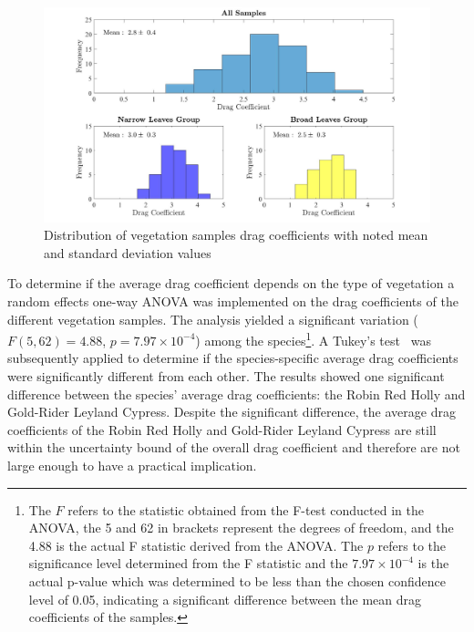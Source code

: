 \documentclass[12pt]{article}
\begin{document}
\begin{figure}[!]
\includegraphics[width=\textwidth,keepaspectratio]{Picture11.jpg}
	\caption[Distribution of drag coefficients for all samples (top), samples with narrow leaves (bottom left), samples with broad leaves (bottom right)]{Distribution of vegetation samples drag coefficients with noted mean and standard deviation values}
	\label{fig:Histogram}
\end{figure}

To determine if the average drag coefficient depends on the type of vegetation a random effects one-way ANOVA was implemented on the drag coefficients of the different vegetation samples. The analysis yielded a significant variation ($F(5,62)=4.88$, $p=7.97 \times 10^{-4}$) among the species\footnote{The $F$ refers to the statistic obtained from the F-test conducted in the ANOVA, the 5 and 62 in brackets represent the degrees of freedom, and the 4.88 is the actual F statistic derived from the ANOVA. The $p$ refers to the significance level determined from the F statistic and the $7.97 \times 10^{-4}$ is the actual p-value which was determined to be less than the chosen confidence level of 0.05, indicating a significant difference between the mean drag coefficients of the samples.}. A Tukey's test~\cite{Lane2010} was subsequently applied to determine if the species-specific average drag coefficients were significantly different from each other. The results showed one significant difference between the species' average drag coefficients: the Robin Red Holly and Gold-Rider Leyland Cypress. Despite the significant difference, the average drag coefficients of the Robin Red Holly and Gold-Rider Leyland Cypress are still within the uncertainty bound of the overall drag coefficient and therefore are not large enough to have a practical implication. 
\end{document}
